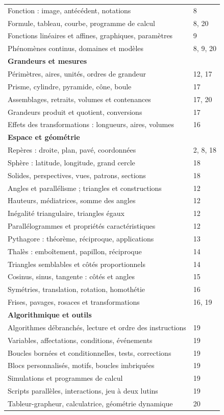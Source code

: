 \documentclass[11pt,a4paper,oneside]{book}
\begin{document}
\begin{longtable}{p{}p{}}
Fonction : image, antécédent, notations & 8\\
Formule, tableau, courbe, programme de calcul & 8, 20\\
Fonctions linéaires et affines, graphiques, paramètres & 9\\
Phénomènes continus, domaines et modèles & 8, 9, 20\\
\midrule
\multicolumn{2}{l}{\textbf{Grandeurs et mesures}}\\
Périmètres, aires, unités, ordres de grandeur & 12, 17\\
Prisme, cylindre, pyramide, cône, boule & 17\\
Assemblages, retraits, volumes et contenances & 17, 20\\
Grandeurs produit et quotient, conversions & 17\\
Effets des transformations : longueurs, aires, volumes & 16\\
\midrule
\multicolumn{2}{l}{\textbf{Espace et géométrie}}\\
Repères : droite, plan, pavé, coordonnées & 2, 8, 18\\
Sphère : latitude, longitude, grand cercle & 18\\
Solides, perspectives, vues, patrons, sections & 18\\
Angles et parallélisme ; triangles et constructions & 12\\
Hauteurs, médiatrices, somme des angles & 12\\
Inégalité triangulaire, triangles égaux & 12\\
Parallélogrammes et propriétés caractéristiques & 12\\
Pythagore : théorème, réciproque, applications & 13\\
Thalès : emboîtement, papillon, réciproque & 14\\
Triangles semblables et côtés proportionnels & 14\\
Cosinus, sinus, tangente : côtés et angles & 15\\
Symétries, translation, rotation, homothétie & 16\\
Frises, pavages, rosaces et transformations & 16, 19\\
\midrule
\multicolumn{2}{l}{\textbf{Algorithmique et outils}}\\
Algorithmes débranchés, lecture et ordre des instructions & 19\\
Variables, affectations, conditions, événements & 19\\
Boucles bornées et conditionnelles, tests, corrections & 19\\
Blocs personnalisés, motifs, boucles imbriquées & 19\\
Simulations et programmes de calcul & 19\\
Scripts parallèles, interactions, jeu à deux lutins & 19\\
Tableur-grapheur, calculatrice, géométrie dynamique & 20\\
\bottomrule
\end{longtable}
\normalsize
\end{document}
